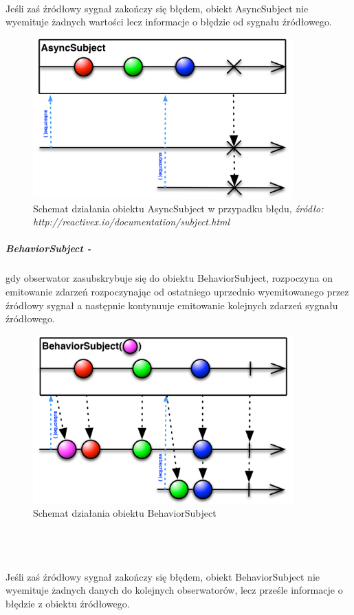 \documentclass[12pt,oneside,a4paper]{report}
\begin{document}
\\
Jeśli zaś źródłowy sygnał zakończy się błędem, obiekt AsyncSubject nie wyemituje żadnych wartości lecz informacje o błędzie od sygnału źródłowego.
\begin{figure}[ht!]
	\centering
	\includegraphics[width=10cm]{asyncSubjectFailed}
	\caption{Schemat działania obiektu AsyncSubject w przypadku błędu, \textit{źródło: http://reactivex.io/documentation/subject.html}}
	\label{asyncSubjectFailed}
\end{figure}
\subparagraph{BehaviorSubject -}gdy obserwator zasubskrybuje się do obiektu BehaviorSubject, rozpoczyna on emitowanie zdarzeń rozpoczynając od ostatniego uprzednio wyemitowanego przez źródłowy sygnał a następnie kontynuuje emitowanie kolejnych zdarzeń sygnału źródłowego.
\begin{figure}[ht!]
	\centering
	\includegraphics[width=10cm]{behaviorSubject}
	\caption{Schemat działania obiektu BehaviorSubject}
	\label{behaviorSubject}
\end{figure}
\\
\\
\\
Jeśli zaś źródłowy sygnał zakończy się błędem, obiekt BehaviorSubject nie wyemituje żadnych danych do kolejnych obserwatorów, lecz prześle informacje o błędzie z obiektu źródłowego.
\end{document}
